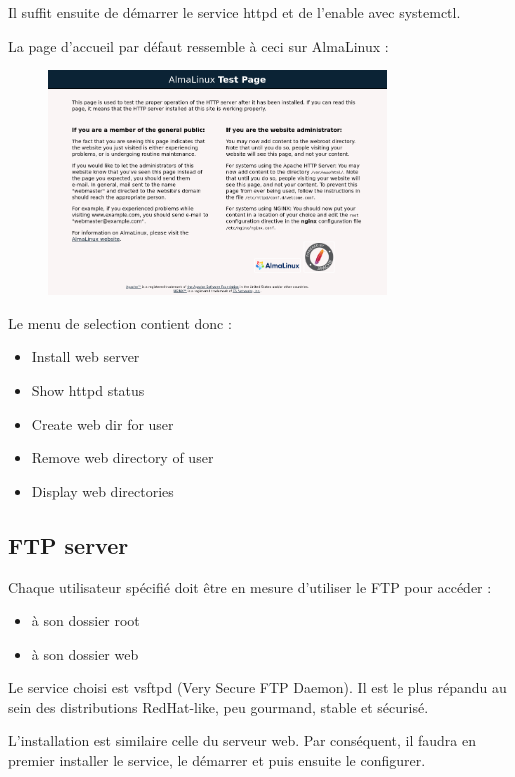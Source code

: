 \documentclass{article}
\begin{document}
	Il suffit ensuite de démarrer le service httpd et de l'enable avec systemctl.
	
	La page d'accueil par défaut ressemble à ceci sur AlmaLinux :
		\begin{figure}[h]
		\centering
		\includegraphics[width=0.8\textwidth]{webservdefault.png}
		
		\label{fig:your_label}
	\end{figure}
	
	Le menu de selection contient donc :
	\begin{itemize}
		\item Install web server
		\item Show httpd status
		\item Create web dir for user
		\item Remove web directory of user
		\item Display web directories
	\end{itemize}
	
	\newpage
	
	
	\subsection{FTP server}
	
	Chaque utilisateur spécifié doit être en mesure d'utiliser le FTP pour accéder :
	\begin{itemize}
		\item à son dossier root
		\item à son dossier web
	\end{itemize}
	
	Le service choisi est vsftpd (Very Secure FTP Daemon). Il est le plus répandu au sein des distributions RedHat-like, peu gourmand, stable et sécurisé.
	
	L'installation est similaire  celle du serveur web. Par conséquent, il faudra en premier installer le service, le démarrer et puis ensuite le configurer.
	
\end{document}
